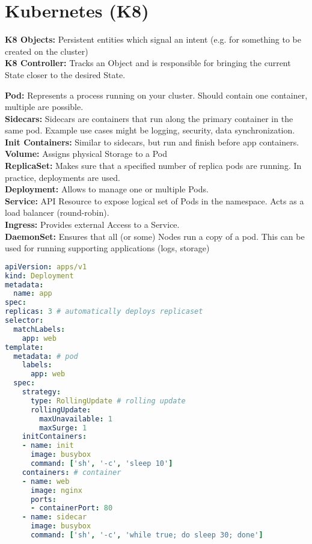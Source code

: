 \section{Kubernetes (K8)}
\begin{mdframed}
	\textbf{K8 Objects:} Persistent entities which signal an intent (e.g. for something to be created on the cluster) \\
	\textbf{K8 Controller:} Tracks an Object and is responsible for bringing the current State closer to the desired State.
\end{mdframed}

\textbf{Pod:} Represents a process running on your cluster. Should contain one container, multiple are possible. \\
\textbf{Sidecars:} Sidecars are containers that run along the primary container in the same pod. Example use cases might be logging, security, data synchronization. \\
\textbf{Init Containers:} Similar to sidecars, but run and finish before app containers.
\textbf{Volume:} Assigns physical Storage to a Pod \\
\textbf{ReplicaSet:} Makes sure that a specified number of replica pods are running. In practice, deployments are used. \\
\textbf{Deployment:} Allows to manage one or multiple Pods. \\
\textbf{Service:} API Resource to expose logical set of Pods in the namespace. Acts as a load balancer (round-robin). \\
\textbf{Ingress:} Provides external Access to a Service. \\
\textbf{DaemonSet:} Ensures that all (or some) Nodes run a copy of a pod. This can be used for running supporting applications (logs, storage)
\begin{lstlisting}[language=yaml]
apiVersion: apps/v1
kind: Deployment
metadata:
  name: app
spec:
replicas: 3 # automatically deploys replicaset
selector:
  matchLabels:
    app: web
template:
  metadata: # pod
    labels:
      app: web
  spec:
    strategy:
      type: RollingUpdate # rolling update
      rollingUpdate:
        maxUnavailable: 1
        maxSurge: 1
    initContainers:
    - name: init
      image: busybox
      command: ['sh', '-c', 'sleep 10']
    containers: # container
    - name: web
      image: nginx
      ports:
      - containerPort: 80
    - name: sidecar
      image: busybox
      command: ['sh', '-c', 'while true; do sleep 30; done']
\end{lstlisting}

